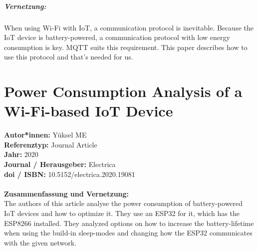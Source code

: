 \documentclass{report}
\begin{document}
\paragraph{Vernetzung:}
When using Wi-Fi with IoT, a communication protocol is inevitable. Because the IoT device is battery-powered, a communication protocol with low energy consumption is key. MQTT suits this requirement. This paper describes how to use this protocol and that's needed for us.


{\let\clearpage\relax \chapter{Power Consumption Analysis of a Wi-Fi-based IoT Device}}
\noindent
\textbf{Autor*innen:} Yüksel ME\\
\textbf{Referenztyp:} Journal Article\\
\textbf{Jahr:} 2020\\
\textbf{Journal / Herausgeber:} Electrica\\
\textbf{doi / ISBN:} 10.5152/electrica.2020.19081\\\\
\textbf{Zusammenfassung und Vernetzung:}\\
The authors of this article analyse the power consumption of battery-powered IoT devices and how to optimize it. They use an ESP32 for it, which has the ESP8266 installed. They analyzed options on how to increase the battery-lifetime when using the build-in sleep-modes and changing how the ESP32 communicates with the given network.\\
\end{document}
